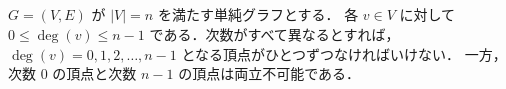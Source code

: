 \subsection{}
$G=(V,E)$ が $|V|=n$ を満たす単純グラフとする．
各 $v\in V$ に対して $0\leq \deg(v) \leq n-1$ である．次数がすべて異なるとすれば，
$\deg(v) = 0, 1, 2, \ldots, n-1$ となる頂点がひとつずつなければいけない．
一方，次数 $0$ の頂点と次数 $n-1$ の頂点は両立不可能である．